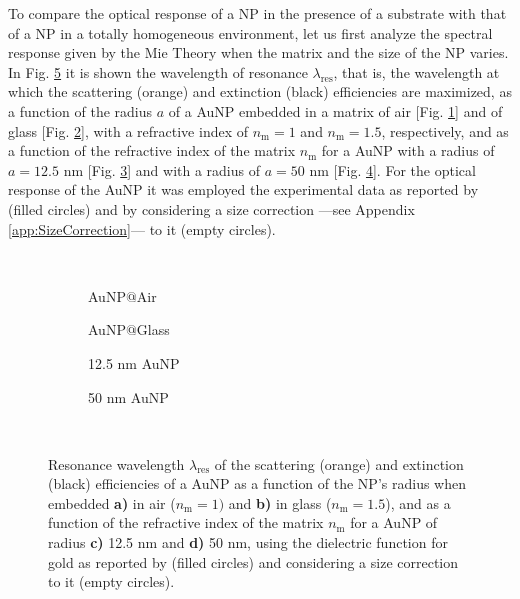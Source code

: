 
To compare the optical response of a NP in the presence of a substrate with that of a NP in a totally homogeneous environment, let us first analyze the spectral response given by the Mie Theory when the matrix and the size of the NP varies. In Fig. \ref{fig:Mie:redshift} it is shown the wavelength of resonance $\lambda_\text{res}$, that is, the wavelength at which the scattering (orange) and extinction (black) efficiencies are maximized,  as a  function of the radius $a$ of a AuNP embedded in a matrix of air [Fig. \ref{sfig:red:1}] and of glass [Fig. \ref{sfig:red:2}], with a refractive index of $n_\text{m} = 1$ and $n_\text{m} = 1.5$, respectively, and as a function of the refractive index of the matrix $n_\text{m}$ for a AuNP with a radius of {$a = 12.5$ nm} [Fig. \ref{sfig:red:3}] and with a radius of $a = 50$ nm [Fig. \ref{sfig:red:4}]. For the optical response of the AuNP it was employed the experimental data as reported by \citeauthor{johnson_optical_1972} \cite{johnson_optical_1972} (filled circles) and by considering a size correction ---see Appendix \ref{app:SizeCorrection}--- to it (empty circles).

\begin{figure}[h!]
    \def\svgwidth{\textwidth}
    \vspace*{-20.9em} \\
    \hspace*{1em}%
        \begin{subfigure}{.225\textwidth}\caption{AuNP$@$Air}\label{sfig:red:1}\end{subfigure}%
        \begin{subfigure}{.28\textwidth}\caption{AuNP$@$Glass}\label{sfig:red:2}\end{subfigure}%
        \begin{subfigure}{.225\textwidth}\caption{12.5 nm AuNP}\label{sfig:red:3}\end{subfigure}%
        \begin{subfigure}{.24\textwidth}\caption{50 nm AuNP}\label{sfig:red:4}\end{subfigure}
    \vspace*{16.5em}\\
    \caption[Spectral redshift of the scattering and extinction  efficiencies of a spherical AuNP as a function of its size and the embedding media]{Resonance wavelength $\lambda_\text{res}$ of the scattering (orange) and extinction (black) efficiencies of a AuNP as a function of the NP's radius when embedded \textbf{a)} in air ($n_\text{m} = 1)$ and \textbf{b)} in glass ($n_\text{m} = 1.5$), and as a function of the refractive index of the matrix  $n_\text{m}$ for a AuNP of radius \textbf{c)} 12.5 nm and \textbf{d)} 50 nm, using the dielectric function for gold as reported by \citeauthor{johnson_optical_1972} \cite{johnson_optical_1972} (filled circles) and considering a size correction to it (empty circles).}
    \label{fig:Mie:redshift}
\end{figure}

